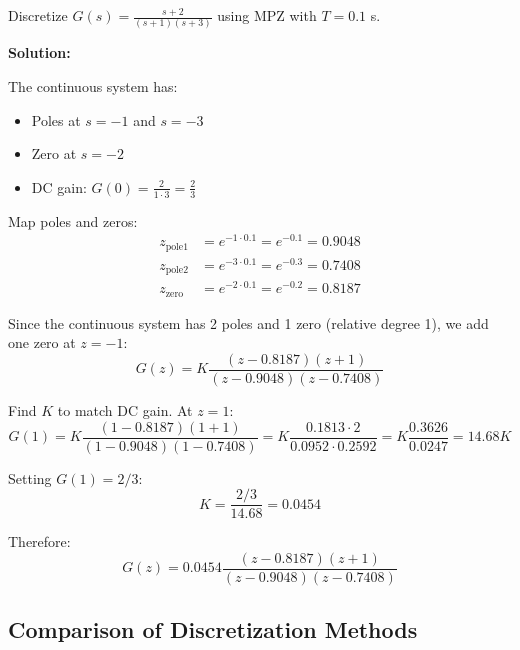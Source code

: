 \begin{example}
\label{ex:mpz_discretization}

Discretize $G(s) = \frac{s+2}{(s+1)(s+3)}$ using MPZ with $T = 0.1$ s.

\textbf{Solution:}

The continuous system has:
\begin{itemize}
    \item Poles at $s = -1$ and $s = -3$
    \item Zero at $s = -2$
    \item DC gain: $G(0) = \frac{2}{1 \cdot 3} = \frac{2}{3}$
\end{itemize}

Map poles and zeros:
\begin{align}
z_{\text{pole1}} &= e^{-1 \cdot 0.1} = e^{-0.1} = 0.9048 \\
z_{\text{pole2}} &= e^{-3 \cdot 0.1} = e^{-0.3} = 0.7408 \\
z_{\text{zero}} &= e^{-2 \cdot 0.1} = e^{-0.2} = 0.8187
\end{align}

Since the continuous system has 2 poles and 1 zero (relative degree 1), we add one zero at $z = -1$:
\begin{equation}
G(z) = K \frac{(z - 0.8187)(z + 1)}{(z - 0.9048)(z - 0.7408)}
\end{equation}

Find $K$ to match DC gain. At $z = 1$:
\begin{equation}
G(1) = K \frac{(1 - 0.8187)(1 + 1)}{(1 - 0.9048)(1 - 0.7408)} = K \frac{0.1813 \cdot 2}{0.0952 \cdot 0.2592} = K \frac{0.3626}{0.0247} = 14.68 K
\end{equation}

Setting $G(1) = 2/3$:
\begin{equation}
K = \frac{2/3}{14.68} = 0.0454
\end{equation}

Therefore:
\begin{equation}
\boxed{G(z) = 0.0454 \frac{(z - 0.8187)(z + 1)}{(z - 0.9048)(z - 0.7408)}}
\end{equation}
\end{example}

\subsection{Comparison of Discretization Methods}

